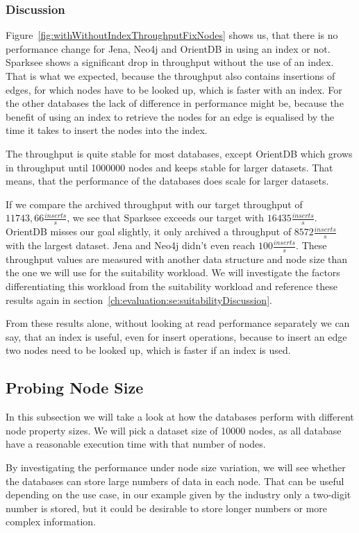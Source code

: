 \subsubsection{Discussion}
Figure~\ref{fig:withWithoutIndexThroughputFixNodes} shows us,
that there is no performance change for Jena, Neo4j and OrientDB in using an index or not.
Sparksee shows a significant drop in throughput without the use of an index.
That is what we expected,
because the throughput also contains insertions of edges,
for which nodes have to be looked up,
which is faster with an index.
For the other databases the lack of difference in performance might be,
because the benefit of using an index to retrieve the nodes for an edge is equalised by the time it takes to insert the nodes into the index.

The throughput is quite stable for most databases,
except OrientDB which grows in throughput until 1000000 nodes and keeps stable for larger datasets.
That means,
that the performance of the databases does scale for larger datasets.

If we compare the archived throughput with our target throughput of $ 11743,66 \frac{inserts}{s} $,
we see that Sparksee exceeds our target with $ 16435 \frac{inserts}{s} $.
OrientDB misses our goal slightly,
it only archived a throughput of $ 8572 \frac{inserts}{s} $ with the largest dataset.
Jena and Neo4j didn't even reach $ 100 \frac{inserts}{s} $.
These throughput values are measured with another data structure and node size than the one we will use for the suitability workload.
We will investigate the factors differentiating this workload from the suitability workload and reference these results again in section~\ref{ch:evaluation:se:suitabilityDiscussion}.

From these results alone,
without looking at read performance separately we can say,
that an index is useful,
even for insert operations,
because to insert an edge two nodes need to be looked up,
which is faster if an index is used.

\subsection{Probing Node Size}
\label{ch:evaluation:se:probingNodeSize}
In this subsection we will take a look at how the databases perform with different node property sizes.
We will pick a dataset size of 10000 nodes,
as all database have a reasonable execution time with that number of nodes.

By investigating the performance under node size variation,
we will see whether the databases can store large numbers of data in each node.
That can be useful depending on the use case,
in our example given by the industry only a two-digit number is stored,
but it could be desirable to store longer numbers or more complex information.

